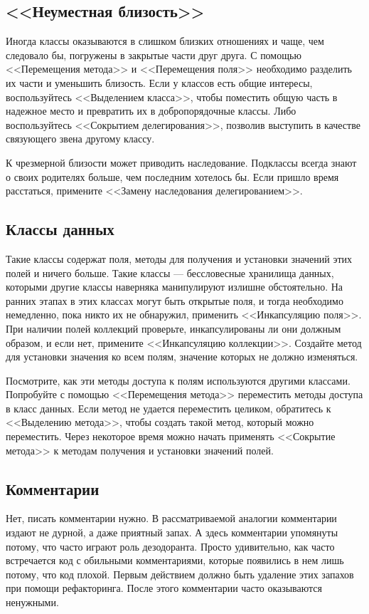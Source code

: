 \documentclass{../../text-style}
\begin{document}
\subsection{<<Неуместная близость>>}

Иногда классы оказываются в слишком близких отношениях и чаще, чем следовало бы, погружены в закрытые части друг друга. С помощью <<Перемещения метода>> и <<Перемещения поля>> необходимо разделить их части и уменьшить близость. Если у классов есть общие интересы, воспользуйтесь <<Выделением класса>>, чтобы поместить общую часть в надежное место и превратить их в добропорядочные классы. Либо воспользуйтесь <<Сокрытием делегирования>>, позволив выступить в качестве связующего звена другому классу.

К чрезмерной близости может приводить наследование. Подклассы всегда знают о своих родителях больше, чем последним хотелось бы. Если пришло время расстаться, примените <<Замену наследования делегированием>>.

\subsection{Классы данных}

Такие классы содержат поля, методы для получения и установки значений этих полей и ничего больше. Такие классы --- бессловесные хранилища данных, которыми другие классы наверняка манипулируют излишне обстоятельно. На ранних этапах в этих классах могут быть открытые поля, и тогда необходимо немедленно, пока никто их не обнаружил, применить <<Инкапсуляцию поля>>. При наличии полей коллекций проверьте, инкапсулированы ли они должным образом, и если нет, примените <<Инкапсуляцию коллекции>>. Создайте метод для установки значения ко всем полям, значение которых не должно изменяться.

Посмотрите, как эти методы доступа к полям используются другими классами. Попробуйте с помощью <<Перемещения метода>> переместить методы доступа в класс данных. Если метод не удается переместить целиком, обратитесь к <<Выделению метода>>, чтобы создать такой метод, который можно переместить. Через некоторое время можно начать применять <<Сокрытие метода>> к методам получения и установки значений полей.

\subsection{Комментарии}

Нет, писать комментарии нужно. В рассматриваемой аналогии комментарии издают не дурной, а даже приятный запах. А здесь комментарии упомянуты потому, что часто играют роль дезодоранта. Просто удивительно, как часто встречается код с обильными комментариями, которые появились в нем лишь потому, что код плохой. Первым действием должно быть удаление этих запахов при помощи рефакторинга. После этого комментарии часто оказываются ненужными.
\end{document}
